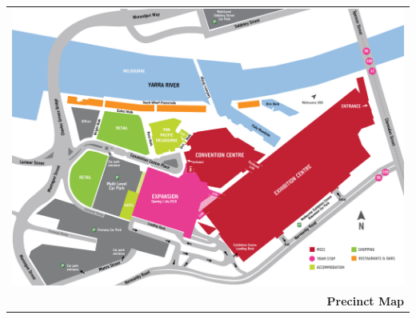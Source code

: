 
\thispagestyle{empty}
\begin{center}
    \begin{tabular}{r}
    \includegraphics[width=\textwidth]{content/maps/mcec_precinct.pdf}\\
    \textbf{Precinct Map}
    \end{tabular}
\end{center}


